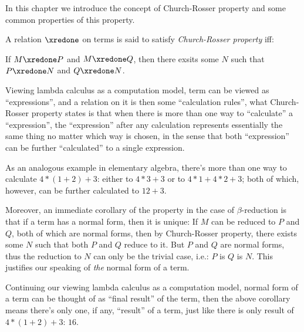 \documentclass[../../../include/open-logic-section]{subfiles}
\begin{document}


In this chapter we introduce the concept of Church-Rosser property and
some common properties of this property.

\begin{defn}
  A relation $\xredone$ on terms is said to satisfy \emph{Church-Rosser
    property} iff:
  
  If $M \xredone P$ and $M \xredone Q$, then there exsits some $N$
  such that $P \xredone N$ and $Q \xredone N$.
\end{defn}

Viewing lambda calculus as a computation model, term can be viewed as
``expressions'', and a relation on it is then some ``calculation
rules'', what Church-Rosser property states is that when there is more
than one way to ``calculate'' a ``expression'', the ``expression'' after
any calculation represents essentially the
same thing no matter which way is chosen, in the sense that both
``expression'' can be further ``calculated'' to a single expression.

As an analogous example in elementary algebra, there's more than one way to calculate $4*(1+2)+3$:
either to $4*3+3$ or to $4*1+4*2+3$; both of which, however, can be
further calculated to $12+3$.

Moreover, an immediate corollary of the property in the case of $\beta$-reduction is that if a term has
a normal form, then it is unique: If $M$ can be
reduced to $P$ and $Q$, both of which are normal forms, then by
Church-Rosser property, there exists some $N$ such that both $P$ and
$Q$ reduce to it. But $P$ and $Q$ are normal forms, thus the
reduction to $N$ can only be the trivial case, i.e.: $P$ is $Q$ is
$N$. This justifies our speaking of \emph{the} normal form of a term.

Continuing our viewing lambda calculus as a computation model, normal form of
a term can be thought of as ``final result'' of the term, then the above
corollary means there's only one, if any, ``result'' of a term, just
like there is only result of $4*(1+2)+3$: $16$.
\end{document}
